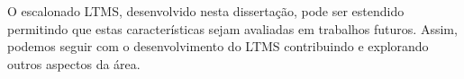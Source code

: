 \documentclass[diss,capa]{texufpel}
\begin{document}
O escalonado LTMS, desenvolvido nesta dissertação, pode ser estendido permitindo que estas características sejam avaliadas em trabalhos futuros. Assim, podemos seguir com o desenvolvimento do LTMS contribuindo e explorando outros aspectos da área.


 




\end{document}
